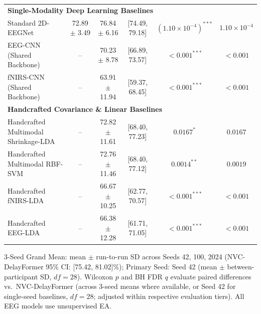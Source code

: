 \documentclass[journal]{IEEEtran}
\begin{document}
\begin{table}[!t]
{\begin{tabular}{@{}lccccc@{}}
\midrule
\multicolumn{6}{l}{\textbf{Single-Modality Deep Learning Baselines}} \\
Standard 2D-EEGNet \cite{lawhern2018eegnet} & 72.89 $\pm$ 3.49 & 76.84 $\pm$ 6.16 & [74.49, 79.18] & $(1.10\times 10^{-4})^{***}$ & $1.10\times 10^{-4}$ \\
EEG-CNN (Shared Backbone) & -- & 70.23 $\pm$ 8.78 & [66.89, 73.57] & $<0.001^{***}$ & $<0.001$ \\
fNIRS-CNN (Shared Backbone) & -- & 63.91 $\pm$ 11.94 & [59.37, 68.45] & $<0.001^{***}$ & $<0.001$ \\
\midrule
\multicolumn{6}{l}{\textbf{Handcrafted Covariance \& Linear Baselines}} \\
Handcrafted Multimodal Shrinkage-LDA \cite{shin2017open} & -- & 72.82 $\pm$ 11.61 & [68.40, 77.23] & $0.0167^{*}$ & $0.0167$ \\
Handcrafted Multimodal RBF-SVM & -- & 72.76 $\pm$ 11.46 & [68.40, 77.12] & $0.0014^{**}$ & $0.0019$ \\
Handcrafted fNIRS-LDA & -- & 66.67 $\pm$ 10.25 & [62.77, 70.57] & $<0.001^{***}$ & $<0.001$ \\
Handcrafted EEG-LDA & -- & 66.38 $\pm$ 12.28 & [61.71, 71.05] & $<0.001^{***}$ & $<0.001$ \\
\bottomrule
\end{tabular}}
\par\smallskip
{\scriptsize 3-Seed Grand Mean: mean $\pm$ run-to-run SD across Seeds 42, 100, 2024 (NVC-DelayFormer 95\% CI: [75.42, 81.02]\%); Primary Seed: Seed 42 (mean $\pm$ between-participant SD, $df=28$). Wilcoxon $p$ and BH FDR $q$ evaluate paired differences vs.\ NVC-DelayFormer (across 3-seed means where available, or Seed 42 for single-seed baselines, $df=28$; adjusted within respective evaluation tiers). All EEG models use unsupervised EA.}
\end{table}
\end{document}
